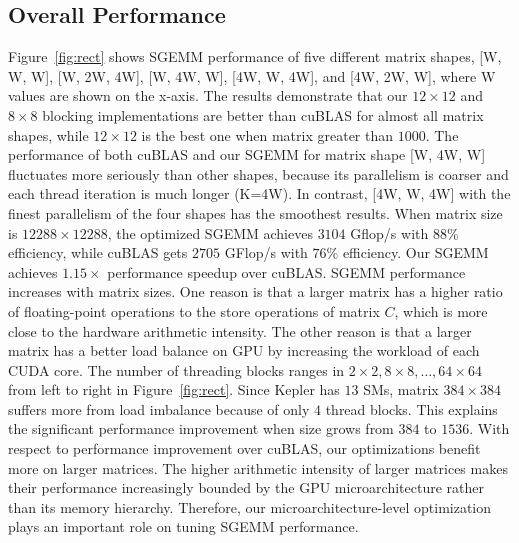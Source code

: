 \subsection{Overall Performance}
Figure~\ref{fig:rect} shows SGEMM performance of five different matrix shapes, [W, W, W], [W, 2W, 4W], [W, 4W, W], [4W, W, 4W], and [4W, 2W, W], where W values are shown on the x-axis.
The results demonstrate that our $12\times12$ and $8\times8$ blocking implementations are better than cuBLAS for almost all matrix shapes, while $12\times12$ is the best one when matrix greater than $1000$.
The performance of both cuBLAS and our SGEMM for matrix shape [W, 4W, W] fluctuates more seriously than other shapes, because its parallelism is coarser and each thread iteration is much longer (K=4W).
In contrast, [4W, W, 4W] with the finest parallelism of the four shapes has the smoothest results.
When matrix size is $12288\times12288$, the optimized SGEMM achieves $3104$
Gflop/s with $88\%$ efficiency, while cuBLAS gets $2705$ GFlop/s with $76\%$ efficiency.
Our SGEMM achieves $1.15 \times$ performance speedup over cuBLAS.%
SGEMM performance increases with matrix sizes. 
One reason is that a larger matrix has a higher ratio of 
floating-point operations to the store operations of matrix $C$, which is more close to the hardware arithmetic intensity. 
The other reason is that a larger matrix has a better load balance on GPU by increasing the workload of each CUDA core.
The number of threading blocks ranges in $2 \times 2, 8 \times 8, \dots, 64 \times 64$ from left to right in Figure~\ref{fig:rect}.
Since Kepler has $13$ SMs, matrix $384\times 384$ suffers more from load imbalance because of only $4$ thread blocks.
This explains the significant performance improvement when size grows from $384$ to $1536$. 
With respect to performance improvement over cuBLAS, our optimizations benefit more on larger matrices. 
The higher arithmetic intensity of larger matrices makes their performance increasingly bounded by the GPU microarchitecture rather than its memory hierarchy. 
Therefore, our microarchitecture-level optimization plays an important role on tuning SGEMM
performance.

